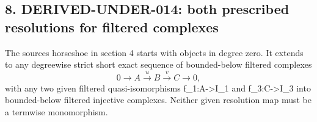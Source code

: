 \documentclass[11pt]{article}
\begin{document}
\subsection{\texorpdfstring{8. DERIVED-UNDER-014:\allowbreak{} both prescribed resolutions for filtered complexes}{8.  both prescribed resolutions for filtered complexes}}\label{proofs-7589-8350-derived-under-014-both-prescribed-resolutions-for-filtered-complexes}

The source\textquotesingle s horseshoe in section 4 starts with objects in degree zero. It extends to any degreewise strict short exact sequence of bounded-below filtered complexes \[
 0\to A\xrightarrow{u}B\xrightarrow{v}C\to0,                 \tag{8.1}
\] with any two given filtered quasi-isomorphisms f\_\allowbreak{}1:\allowbreak{}A\allowbreak{}->I\_\allowbreak{}1 and f\_\allowbreak{}3:\allowbreak{}C\allowbreak{}->I\_\allowbreak{}3 into bounded-below filtered injective complexes. Neither given resolution map must be a termwise monomorphism.
\end{document}
